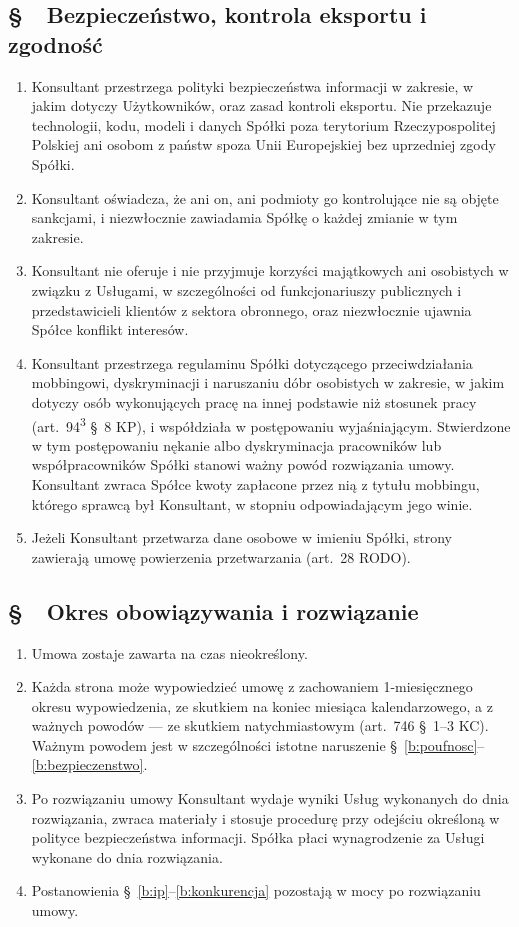 \documentclass[11pt,a4paper]{report}
\newcounter{paragraf}
\newcommand{\paragraf}[1]{%
  \refstepcounter{paragraf}%
  \Needspace{5\baselineskip}%
  \subsection*{\S~\theparagraf\ #1}%
}
\newenvironment{ContractClause}[1]{\paragraf{#1}}{\par}
\begin{document}
\begin{ContractClause}{Bezpieczeństwo, kontrola eksportu i zgodność}
\label{b:bezpieczenstwo}
\begin{enumerate}
  \item Konsultant przestrzega polityki bezpieczeństwa informacji w zakresie, w jakim dotyczy Użytkowników, oraz zasad kontroli eksportu. Nie przekazuje technologii, kodu, modeli i danych Spółki poza terytorium Rzeczypospolitej Polskiej ani osobom z państw spoza Unii Europejskiej bez uprzedniej zgody Spółki.
  \item Konsultant oświadcza, że ani on, ani podmioty go kontrolujące nie są objęte sankcjami, i niezwłocznie zawiadamia Spółkę o każdej zmianie w tym zakresie.
  \item Konsultant nie oferuje i nie przyjmuje korzyści majątkowych ani osobistych w związku z Usługami, w szczególności od funkcjonariuszy publicznych i przedstawicieli klientów z sektora obronnego, oraz niezwłocznie ujawnia Spółce konflikt interesów.
  \item Konsultant przestrzega regulaminu Spółki dotyczącego przeciwdziałania mobbingowi, dyskryminacji i naruszaniu dóbr osobistych w zakresie, w jakim dotyczy osób wykonujących pracę na innej podstawie niż stosunek pracy (art.~94\textsuperscript{3} §~8 KP), i współdziała w postępowaniu wyjaśniającym. Stwierdzone w tym postępowaniu nękanie albo dyskryminacja pracowników lub współpracowników Spółki stanowi ważny powód rozwiązania umowy. Konsultant zwraca Spółce kwoty zapłacone przez nią z tytułu mobbingu, którego sprawcą był Konsultant, w stopniu odpowiadającym jego winie.
  \item Jeżeli Konsultant przetwarza dane osobowe w imieniu Spółki, strony zawierają umowę powierzenia przetwarzania (art.~28 RODO).
\end{enumerate}
\end{ContractClause}

\begin{ContractClause}{Okres obowiązywania i rozwiązanie}
\begin{enumerate}
  \item Umowa zostaje zawarta na czas nieokreślony.
  \item Każda strona może wypowiedzieć umowę z zachowaniem 1-miesięcznego okresu wypowiedzenia, ze skutkiem na koniec miesiąca kalendarzowego, a z ważnych powodów --- ze skutkiem natychmiastowym (art.~746 §~1--3 KC). Ważnym powodem jest w szczególności istotne naruszenie §~\ref{b:poufnosc}--\ref{b:bezpieczenstwo}.
  \item Po rozwiązaniu umowy Konsultant wydaje wyniki Usług wykonanych do dnia rozwiązania, zwraca materiały i stosuje procedurę przy odejściu określoną w polityce bezpieczeństwa informacji. Spółka płaci wynagrodzenie za Usługi wykonane do dnia rozwiązania.
  \item Postanowienia §~\ref{b:ip}--\ref{b:konkurencja} pozostają w mocy po rozwiązaniu umowy.
\end{enumerate}
\end{ContractClause}
\end{document}
